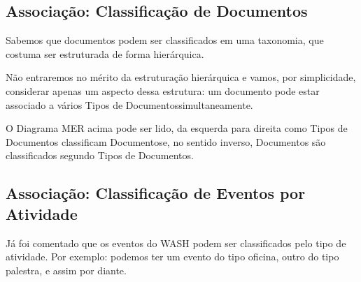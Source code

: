 \documentclass[
12pt,		%
openright,	%
twoside,  %
a4paper,			%
chapter=TITLE,		%
english,			%
french,				%
spanish,			%
brazil				%
]{USPSC-classe/USPSC}
\begin{document}
\subsection[Associa\c{c}\~ao: Classifica\c{c}\~ao de Documentos]{Associa\c{c}\~ao: Classifica\c{c}\~ao de Documentos}\label{Associa\c{c}\~ao: Classifica\c{c}\~ao de Documentos}
Sabemos que documentos podem ser classificados em uma taxonomia, que costuma ser estruturada de forma hier\'arquica.














N\~ao entraremos no m\'erito da estrutura\c{c}\~ao hier\'arquica e vamos, por simplicidade, considerar apenas um aspecto dessa estrutura: um documento pode estar associado a v\'arios \textquotedbl Tipos de Documentos\textquotedbl  simultaneamente.
















O Diagrama MER acima pode ser lido, da esquerda para direita como \textquotedbl Tipos de Documentos classificam Documentos\textquotedbl  e, no sentido inverso, \textquotedbl Documentos s\~ao classificados segundo Tipos de Documentos\textquotedbl .














\subsection[Associa\c{c}\~ao: Classifica\c{c}\~ao de Eventos por Atividade]{Associa\c{c}\~ao: Classifica\c{c}\~ao de Eventos por Atividade}\label{Associa\c{c}\~ao: Classifica\c{c}\~ao de Eventos por Atividade}
J\'a foi comentado que os eventos do WASH podem ser classificados pelo tipo de atividade. Por exemplo: podemos ter um evento do tipo oficina, outro do tipo palestra, e assim por diante.
\end{document}
